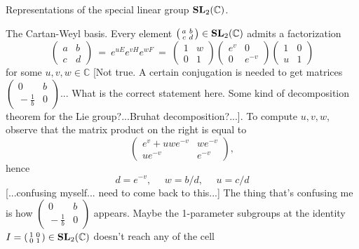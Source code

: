 \documentclass[letterpaper,11pt, reqno]{amsart}
\newtheorem{monodromy theorem}{Monodromy Theorem}[subsection]
\newtheorem{wild conjecture}[theorem]{Wild Conjecture}
\newtheorem{research objectives}{Research objectives}[subsection]
\newtheorem{research question}[theorem]{Research questions}
\newtheorem{aside question}[theorem]{Aside question}
\newtheorem{audio example}[theorem]{\loudspeaker[3] Example}
\newtheorem{blank remark}[theorem]{}
\newtheorem{terminology and comment}[theorem]{Terminology and comment}
\newtheorem{purity hypothesis}[theorem]{Purity hypothesis}
\newtheorem{corollary of the purity hypothesis}[theorem]{Corollary of the purity hypothesis}
\newcommand{\CC} {{\mathbb C}}
\numberwithin{equation}{theorem}
\begin{document}
\begin{section}{Representations of the special linear group $\bold{SL}_{2}(\CC)$.}
\begin{subsection}{The Cartan-Weyl basis.}
Every element $\left(\begin{smallmatrix} a & b \\ c & d\end{smallmatrix}\right)\in\bold{SL}_{2}(\CC)$ admits a factorization
	$$
	\left(\!\begin{array}{cc}a & b \\ c & d\end{array}\!\right)
	\ =\ 
	e^{u E}e^{v H}e^{w F}
	\ =\ 
	\left(\!\begin{array}{cc}1 & w \\ 0 & 1\end{array}\!\right)
	\left(\!\begin{array}{cc}e^{v} & 0 \\ 0 & e^{-v}\end{array}\!\right)
	\left(\!\begin{array}{cc}1 & 0 \\ u & 1\end{array}\!\right)
	$$
for some $u,v,w\in\CC$ {\color{red} [Not true. A certain conjugation is needed to get matrices $\left(\begin{smallmatrix} 0 & b \\ \!\!-\tfrac{1}{b} & 0\end{smallmatrix}\right)$... What is the correct statement here. Some kind of decomposition theorem for the Lie group?...Bruhat decomposition?...]}. To compute $u,v,w$, observe that the matrix product on the right is equal to
	$$
	\left(\!\begin{array}{cc}e^v+uwe^{-v} & we^{-v} \\ ue^{-v} & e^{-v}\end{array}\!\right),
	$$
hence
	$$
	d=e^{-v},
	\ \ \ \ \ \ 
	w=b/d,
	\ \ \ \ \ \ 
	u=c/d
	$$
{\color{red} [...confusing myself... need to come back to this...]} The thing that's confusing me is how $\left(\begin{smallmatrix} 0 & b \\ \!\!-\tfrac{1}{b} & 0\end{smallmatrix}\right)$ appears. Maybe the 1-parameter subgroups at the identity $I=\left(\begin{smallmatrix} 1 & 0 \\ 0 & 1\end{smallmatrix}\right)\in\bold{SL}_{2}(\CC)$ doesn't reach any of the cell

\end{subsection}
\end{section}
\end{document}
